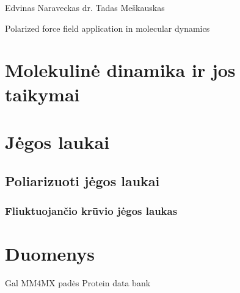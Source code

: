 \documentclass[a4paper,12pt,fleqn,tikz]{article}
\begin{document}
    {Edvinas Naraveckas}
    {}{}{}{}%
    {dr. Tadas Meškauskas}

    \tableofcontents



    \bothabstracts{}%
    {Polarized force field application in molecular dynamics} %
    {}%


    



    \newpage
    \section{Molekulinė dinamika ir jos taikymai}
    \label{sec:molecular_dynamics_section}
    



    \newpage
    \section{Jėgos laukai}
    \label{sec:force_field}
    

    \subsection{Poliarizuoti jėgos laukai}
    \label{sec:polarized_force_fields}
    


    \subsubsection{Fliuktuojančio krūvio jėgos laukas}
    \label{sec:fluctuating_charge}
    



    \newpage
    \section{Duomenys}
    \label{sec:data}
    Gal MM4MX padės Protein data bank
\end{document}
